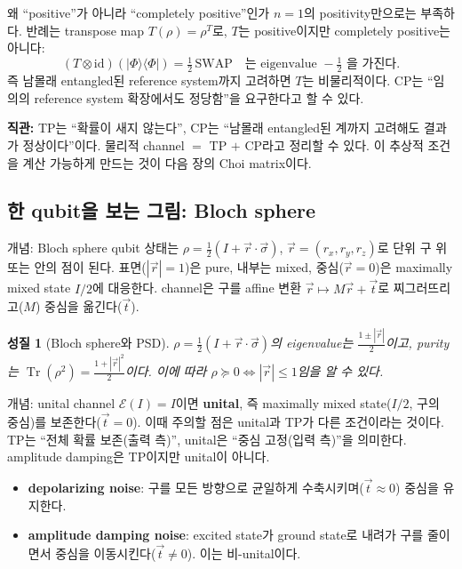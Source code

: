 \documentclass[11pt,a4paper]{article}
\newcommand{\E}{\mathcal{E}}
\newcommand{\Tr}{\operatorname{Tr}}
\newcommand{\id}{\mathrm{id}}
\theoremstyle{definition}
\theoremstyle{plain}
\newtheorem{property}{성질}[section]
\theoremstyle{remark}
\begin{document}
\begin{mathbox}{왜 ``positive''가 아니라 ``completely positive''인가}
$n=1$의 positivity만으로는 부족하다. 반례는 transpose map $T(\rho)=\rho^T$로, $T$는 positive이지만 completely positive는 아니다:
\[
(T\otimes\id)(|\Phi\rangle\langle\Phi|)=\tfrac12\,\mathrm{SWAP}\quad\text{는 eigenvalue }-\tfrac12\text{ 을 가진다.}
\]
즉 남몰래 entangled된 reference system까지 고려하면 $T$는 비물리적이다. CP는 ``임의의 reference system 확장에서도 정당함''을 요구한다고 할 수 있다.
\end{mathbox}

\begin{intuitionbox}
\textbf{직관:} TP는 ``확률이 새지 않는다'', CP는 ``남몰래 entangled된 계까지 고려해도 결과가 정상이다''이다. 물리적 channel $=$ TP $+$ CP라고 정리할 수 있다. 이 추상적 조건을 계산 가능하게 만드는 것이 다음 장의 Choi matrix이다.
\end{intuitionbox}

\subsection{한 qubit을 보는 그림: Bloch sphere}

\begin{conceptbox}{개념: Bloch sphere}
qubit 상태는 $\rho=\tfrac12(I+\vec r\cdot\vec\sigma)$, $\vec r=(r_x,r_y,r_z)$로 단위 구 위 또는 안의 점이 된다. 표면($|\vec r|=1$)은 pure, 내부는 mixed, 중심($\vec r=0$)은 maximally mixed state $I/2$에 대응한다. channel은 구를 affine 변환 $\vec r\mapsto M\vec r+\vec t$로 찌그러뜨리고($M$) 중심을 옮긴다($\vec t$).
\end{conceptbox}

\begin{property}[Bloch sphere와 PSD]
$\rho=\tfrac12(I+\vec r\cdot\vec\sigma)$의 eigenvalue는 $\tfrac{1\pm|\vec r|}{2}$이고, purity는 $\Tr(\rho^2)=\tfrac{1+|\vec r|^2}{2}$이다. 이에 따라 $\rho\succeq0\iff|\vec r|\le1$임을 알 수 있다.
\end{property}

\begin{conceptbox}{개념: unital channel}
$\E(I)=I$이면 \textbf{unital}, 즉 maximally mixed state($I/2$, 구의 중심)를 보존한다($\vec t=0$). 이때 주의할 점은 unital과 TP가 다른 조건이라는 것이다. TP는 ``전체 확률 보존(출력 측)'', unital은 ``중심 고정(입력 측)''을 의미한다. amplitude damping은 TP이지만 unital이 아니다.
\end{conceptbox}

\begin{itemize}
  \item \textbf{depolarizing noise}: 구를 모든 방향으로 균일하게 수축시키며($\vec t\approx0$) 중심을 유지한다.
  \item \textbf{amplitude damping noise}: excited state가 ground state로 내려가 구를 줄이면서 중심을 이동시킨다($\vec t\neq0$). 이는 비-unital이다.
\end{itemize}
\end{document}
